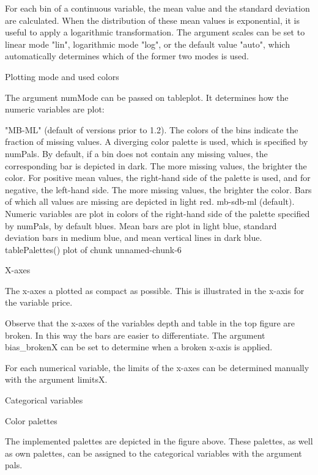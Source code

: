 For each bin of a continuous variable, the mean value and the standard deviation are calculated. When the distribution of these mean values is exponential, it is useful to apply a logarithmic transformation. The argument scales can be set to linear mode "lin", logarithmic mode "log", or the default value "auto", which automatically determines which of the former two modes is used.

Plotting mode and used colors

The argument numMode can be passed on tableplot. It determines how the numeric variables are plot:

"MB-ML" (default of versions prior to 1.2). The colors of the bins indicate the fraction of missing values. A diverging color palette is used, which is specified by numPals. By default, if a bin does not contain any missing values, the corresponding bar is depicted in dark. The more missing values, the brighter the color. For positive mean values, the right-hand side of the palette is used, and for negative, the left-hand side. The more missing values, the brighter the color. Bars of which all values are missing are depicted in light red.
mb-sdb-ml (default). Numeric variables are plot in colors of the right-hand side of the palette specified by numPals, by default blues. Mean bars are plot in light blue, standard deviation bars in medium blue, and mean vertical lines in dark blue.
tablePalettes()
plot of chunk unnamed-chunk-6

X-axes

The x-axes a plotted as compact as possible. This is illustrated in the x-axis for the variable price.

Observe that the x-axes of the variables depth and table in the top figure are broken. In this way the bars are easier to differentiate. The argument bias_brokenX can be set to determine when a broken x-axis is applied.

For each numerical variable, the limits of the x-axes can be determined manually with the argument limitsX.

Categorical variables

Color palettes

The implemented palettes are depicted in the figure above. These palettes, as well as own palettes, can be assigned to the categorical variables with the argument pals.

